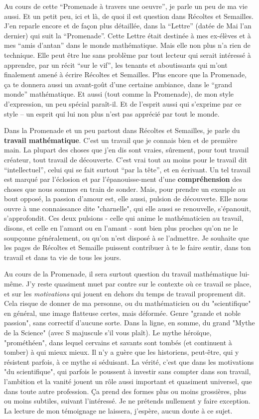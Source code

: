Au cours de cette ``Promenade à travers une oeuvre'', je parle un peu de ma vie aussi. Et un petit peu, ici et là, de quoi il est question dans Récoltes et Semailles. J'en reparle encore et de façon plus détaillée, dans la ``Lettre'' (datée de Mai l'an dernier) qui suit la ``Promenade''. Cette Lettre était destinée à mes ex-élèves et à mes ``amis d'antan'' dans le monde mathématique. Mais elle non plus n'a rien de technique. Elle peut être lue sans problème par tout lecteur qui serait intéressé à apprendre, par un récit ``sur le vif'', les tenants et aboutissants qui m'ont finalement amené à écrire Récoltes et Semailles. Plus encore que la Promenade, ça te donnera aussi un avant-goût d'une certaine ambiance, dans le ``grand monde'' mathématique. Et aussi (tout comme la Promenade), de mon style d'expression, un peu spécial paraît-il. Et de l'esprit aussi qui s'exprime par ce style -- un esprit qui lui non plus n'est pas apprécié par tout le monde.

Dans la Promenade et un peu partout dans Récoltes et Semailles, je parle du \textbf{travail mathématique}. C'est un travail que je connais bien et de première main. La plupart des choses que j'en dis sont vraies, sûrement, pour tout travail créateur, tout travail de découverte. C'est vrai tout au moins pour le travail dit ``intellectuel'', celui qui se fait surtout ``par la tête'', et en écrivant. Un tel travail est marqué par l'éclosion et par l'épanouisse-ment d’une \textbf{compréhension} des choses que nous sommes en train de sonder. Mais, pour prendre un exemple au bout opposé, la passion d’amour est, elle aussi, pulsion de découverte. Elle nous ouvre à une connaissance dite "charnelle", qui elle aussi se renouvelle, s’épanouit, s’approfondit. Ces deux pulsions - celle qui anime le mathématicien au travail, disons, et celle en l’amant ou en l’amant - sont bien plus proches qu’on ne le soupçonne généralement, ou qu’on n’est disposé à se l’admettre. Je souhaite que les pages de Récoltes et Semaille puissent contribuer à te le faire sentir, dans ton travail et dans ta vie de tous les jours.

Au cours de la Promenade, il sera surtout question du travail mathématique lui-même. J’y reste quasiment muet par contre sur le contexte où ce travail se place, et sur les \textit{motivations} qui jouent en dehors du temps de travail proprement dit. Cela risque de donner de ma personne, ou du mathématicien ou du "scientifique" en général, une image flatteuse certes, mais déformée. Genre "grande et noble passion", sans correctif d’aucune sorte. Dans la ligne, en somme, du grand "Mythe de la Science" (avec S majuscule s’il vous plaît). Le mythe héroïque, "prométhéen", dans lequel cervains et savants sont tombés (et continuent à tomber) à qui mieux mieux. Il n’y a guère que les historiens, peut-être, qui y résistent parfois, à ce mythe si séduisant. La vérité, c’est que dans les motivations "du scientifique", qui parfois le poussent à investir sans compter dans son travail, l’ambition et la vanité jouent un rôle aussi important et quasiment universel, que dans toute autre profession. Ça prend des formes plus ou moins grossières, plus ou moins subtiles, suivant l’intéressé. Je ne prétends nullement y faire exception. La lecture de mon témoignage ne laissera, j’espère, aucun doute à ce sujet.

